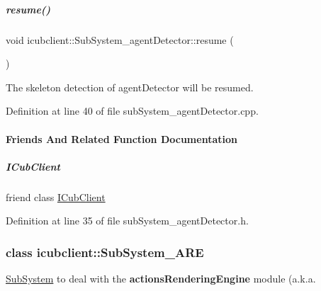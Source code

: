 \mbox{\label{group__icubclient__subsystems_a7fec79d5874e55d2d093c858b70b96bd}} 
\subparagraph{\texorpdfstring{resume()}{resume()}}
{\footnotesize\ttfamily void icubclient\+::\+Sub\+System\+\_\+agent\+Detector\+::resume (\begin{DoxyParamCaption}{ }\end{DoxyParamCaption})}



The skeleton detection of agent\+Detector will be resumed. 



Definition at line 40 of file sub\+System\+\_\+agent\+Detector.\+cpp.



\paragraph{Friends And Related Function Documentation}
\mbox{\label{group__icubclient__subsystems_a56c42753f30380d8abf4a96bc322b3b0}} 
\subparagraph{\texorpdfstring{I\+Cub\+Client}{ICubClient}}
{\footnotesize\ttfamily friend class \hyperlink{group__icubclient__clients_classicubclient_1_1ICubClient}{I\+Cub\+Client}\hspace{0.3cm}{\ttfamily [friend]}}



Definition at line 35 of file sub\+System\+\_\+agent\+Detector.\+h.

\label{classicubclient_1_1SubSystem__ARE}
\subsubsection{class icubclient\+:\+:Sub\+System\+\_\+\+A\+RE}
\hyperlink{group__icubclient__subsystems_classicubclient_1_1SubSystem}{Sub\+System} to deal with the {\bfseries actions\+Rendering\+Engine} module (a.\+k.\+a. 

